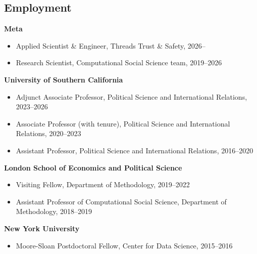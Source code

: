 \documentclass[margin,line,11pt]{resume}
\begin{document}
\begin{resume}
    \section{\mysidestyle Employment}
    \textbf{Meta}
    \begin{itemize}
    \item[] Applied Scientist \& Engineer, Threads Trust \& Safety, 2026--
    \vspace{-.15cm}            
    \item[] Research Scientist, Computational Social Science team, 2019--2026
    \end{itemize}
    \vspace{-.15cm}      
    \textbf{University of Southern California}
    \begin{itemize}
    \item[] Adjunct Associate Professor, Political Science and International Relations, 2023--2026
    \vspace{-.15cm}        
    \item[] Associate Professor (with tenure), Political Science and International Relations, 2020--2023
    \vspace{-.15cm}    
    \item[] Assistant Professor, Political Science and International Relations, 2016--2020
    \end{itemize}    
    \vspace{-.15cm}    
    \textbf{London School of Economics and Political Science}
    \begin{itemize}
    \item[] Visiting Fellow, Department of Methodology, 2019--2022
    \vspace{-.15cm}    
    \item[] Assistant Professor of Computational Social Science, Department of Methodology, 2018--2019
    \end{itemize}
    \vspace{-.30cm}
    \textbf{New York University}
    \begin{itemize}
    \item[] Moore-Sloan Postdoctoral Fellow, Center for Data Science, 2015--2016
    \end{itemize}
        

\end{resume}
\end{document}
